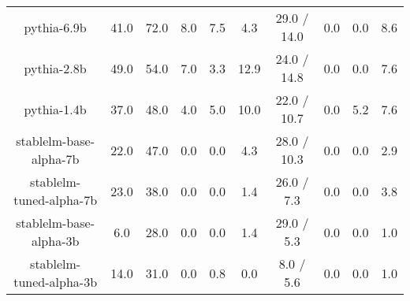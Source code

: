 \begin{table}[]
\begin{adjustbox}{max width=\textwidth}
\begin{tabular}{@{}cccccccccc@{}}
pythia-6.9b  & 41.0 & 72.0 & 8.0  & 7.5  & 4.3  & 29.0 / 14.0 & 0.0 & 0.0  & 8.6  \\
pythia-2.8b  & 49.0 & 54.0 & 7.0  & 3.3  & 12.9 & 24.0 / 14.8 & 0.0 & 0.0  & 7.6  \\
pythia-1.4b  & 37.0 & 48.0 & 4.0  & 5.0  & 10.0 & 22.0 / 10.7 & 0.0 & 5.2  & 7.6  \\
\cmidrule(lr){1-1}
stablelm-base-alpha-7b  & 22.0 & 47.0 & 0.0  & 0.0  & 4.3  & 28.0 / 10.3 & 0.0 & 0.0  & 2.9  \\
stablelm-tuned-alpha-7b & 23.0 & 38.0 & 0.0  & 0.0  & 1.4  & 26.0 / 7.3  & 0.0 & 0.0  & 3.8  \\
stablelm-base-alpha-3b  & 6.0  & 28.0 & 0.0  & 0.0  & 1.4  & 29.0 / 5.3  & 0.0 & 0.0  & 1.0  \\
stablelm-tuned-alpha-3b & 14.0 & 31.0 & 0.0  & 0.8  & 0.0  & 8.0 / 5.6   & 0.0 & 0.0  & 1.0  \\
\bottomrule
\end{tabular}
\end{adjustbox}
\end{table}